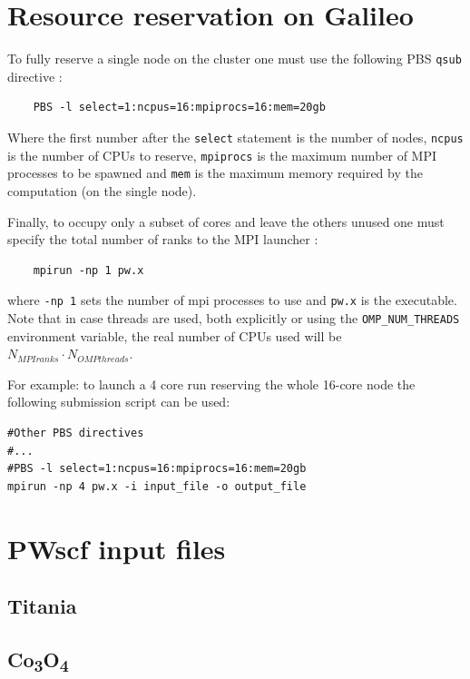 \documentclass[a4paper,12pt]{article}
\newcommand\CO{Co\textsubscript{3}O\textsubscript{4} }
\begin{document}
\begin{appendices}
\begin{figure}[hhh!]
\end{figure}

\section{Resource reservation on Galileo}\label{app:PBS}
To fully reserve a single node on the cluster one must use the following PBS \texttt{qsub} directive :
\begin{verbatim}
	PBS -l select=1:ncpus=16:mpiprocs=16:mem=20gb
\end{verbatim}

Where the first number after the \texttt{select} statement is the number of nodes, \texttt{ncpus} is the number of CPUs to reserve, \texttt{mpiprocs} is the maximum number of MPI processes to be spawned and \texttt{mem} is the maximum memory required by the computation (on the single node).

Finally, to occupy only a subset of cores and leave the others unused one must specify the total number of ranks to the MPI launcher :
\begin{verbatim}
	mpirun -np 1 pw.x
\end{verbatim}
where \texttt{-np 1} sets the number of mpi processes to use and \texttt{pw.x} is the executable.
Note that in case threads are used, both explicitly or using the \texttt{OMP\_NUM\_THREADS} environment variable, the real number of CPUs used will be $N_{MPI ranks} \cdot N_{OMP threads}$.

For example: to launch a 4 core run reserving the whole 16-core node the following submission script can be used:
\begin{verbatim}
#Other PBS directives
#...
#PBS -l select=1:ncpus=16:mpiprocs=16:mem=20gb
mpirun -np 4 pw.x -i input_file -o output_file 
\end{verbatim}

\newpage 

\section{PWscf input files}\label{app:inputFiles}
\subsection{Titania}\label{app:titania}


\subsection{\CO}\label{app:Co3}



\end{appendices}
\end{document}
